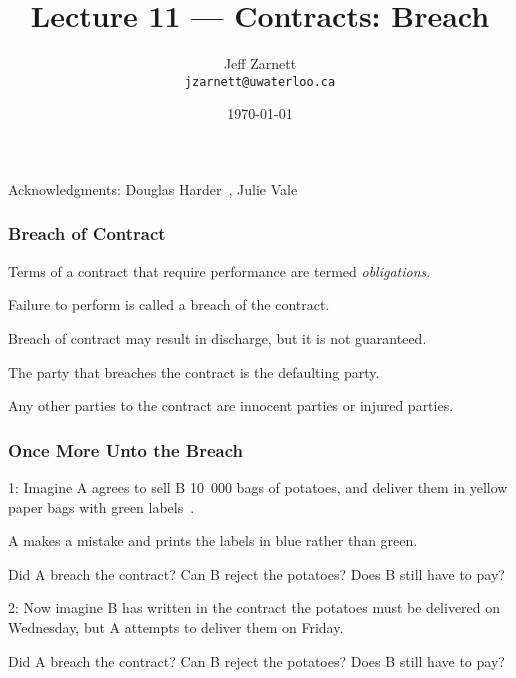 

\title{Lecture 11  --- Contracts: Breach }

\author{Jeff Zarnett \\ \small \texttt{jzarnett@uwaterloo.ca}}
\date{\today}




\begin{frame}
  \titlepage

\begin{center}
  \small{Acknowledgments: Douglas Harder~\cite{dwh}, Julie Vale~\cite{jv}}
  \end{center}
\end{frame}


 

\begin{frame}
\frametitle{Breach of Contract}

Terms of a contract that require performance are termed \textit{obligations}.

Failure to perform is called a \alert{breach} of the contract.

Breach of contract may result in discharge, but it is not guaranteed.

The party that breaches the contract is the \alert{defaulting} party.

Any other parties to the contract are \alert{innocent} parties or \alert{injured} parties.

\end{frame}



\begin{frame}
\frametitle{Once More Unto the Breach}

1: Imagine A agrees to sell B 10~000 bags of potatoes, and deliver them in yellow paper bags with green labels~\cite{lba}.

A makes a mistake and prints the labels in blue rather than green. 

Did A breach the contract? Can B reject the potatoes? Does B still have to pay?

2: Now imagine B has written in the contract the potatoes must be delivered on Wednesday, but A attempts to deliver them on Friday.


Did A breach the contract? Can B reject the potatoes? Does B still have to pay?

\end{frame}



